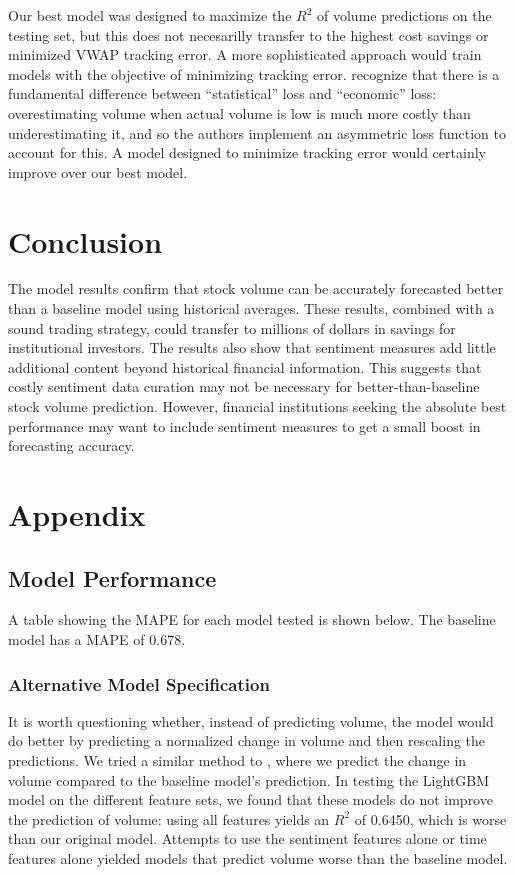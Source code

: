 \documentclass[12pt]{article}
\begin{document}
Our best model was designed to maximize the $R^2$ of volume predictions on the testing set, but this does not necesarilly transfer to the highest cost savings or minimized VWAP tracking error. A more sophisticated approach would train models with the objective of minimizing tracking error. \textcite{goyenko2024trading} recognize that there is a fundamental difference between ``statistical'' loss and ``economic'' loss: overestimating volume when actual volume is low is much more costly than underestimating it, and so the authors implement an asymmetric loss function to account for this. A model designed to minimize tracking error would certainly improve over our best model.

\section{Conclusion}
\label{section:conclusion}
The model results confirm that stock volume can be accurately forecasted better than a baseline model using historical averages. These results, combined with a sound trading strategy, could transfer to millions of dollars in savings for institutional investors. The results also show that sentiment measures add little additional content beyond historical financial information. This suggests that costly sentiment data curation may not be necessary for better-than-baseline stock volume prediction. However, financial institutions seeking the absolute best performance may want to include sentiment measures to get a small boost in forecasting accuracy.

\newpage
\printbibliography
\newpage

\section{Appendix}
\subsection{Model Performance}
\label{section:appendix_model_performance}
A table showing the MAPE for each model tested is shown below. The baseline model has a MAPE of 0.678.


\subsubsection{Alternative Model Specification}
It is worth questioning whether, instead of predicting volume, the model would do better by predicting a normalized change in volume and then rescaling the predictions. We tried a similar method to \textcite{goyenko2024trading}, where we predict the change in volume compared to the baseline model's prediction. In testing the LightGBM model on the different feature sets, we found that these models do not improve the prediction of volume: using all features yields an $R^2$ of 0.6450, which is worse than our original model. Attempts to use the sentiment features alone or time features alone yielded models that predict volume worse than the baseline model.
\end{document}
